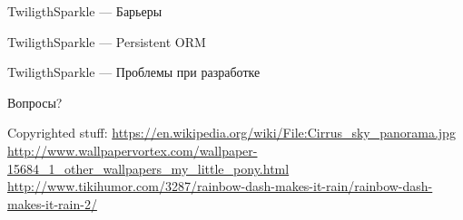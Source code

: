 \documentclass[10pt]{beamer}
\begin{document}
\begin{frame}{TwiligthSparkle — Барьеры}

\end{frame}

\begin{frame}{TwiligthSparkle — Persistent ORM}

\end{frame}

\begin{frame}{TwiligthSparkle — Проблемы при разработке}

\end{frame}

\begin{frame}
  \begin{center}
    \Large
    Вопросы?
  \end{center}
\end{frame}

\begin{frame}\label{lastframe}
  Copyrighted stuff:
  \footnotesize
  \url{https://en.wikipedia.org/wiki/File:Cirrus\_sky\_panorama.jpg} \\
  \url{http://www.wallpapervortex.com/wallpaper-15684\_1\_other\_wallpapers\_my\_little\_pony.html} \\
  \url{http://www.tikihumor.com/3287/rainbow-dash-makes-it-rain/rainbow-dash-makes-it-rain-2/}
\end{frame}
\end{document}
